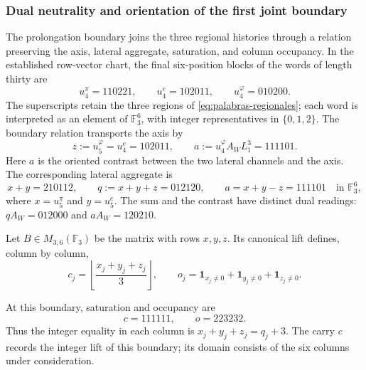 \subsubsection{Dual neutrality and orientation of the first joint boundary}
\label{mg01:frontera}

The prolongation boundary joins the three regional histories through
a relation preserving the axis, lateral aggregate, saturation, and
column occupancy. In the established row-vector chart, the final
six-position blocks of the words of length thirty are
\[
 u_4^\pi=110221,\qquad u_4^e=102011,\qquad
 u_4^\varphi=010200.
\]
The superscripts retain the three regions of
\eqref{eq:palabras-regionales}; each word is interpreted as an
element of \(\mathbb F_3^6\), with integer representatives in
\(\{0,1,2\}\). The boundary relation transports the axis by
\begin{equation}
 z:=u_5^\varphi=u_4^e=102011,
 \qquad a:=u_4^\varphi A_WL_1^3=111101.
 \label{mg01:eje-contraste}
\end{equation}
Here \(a\) is the oriented contrast between the two lateral channels
and the axis. The corresponding lateral aggregate is
\begin{equation}
 x+y=210112,\qquad
 q:=x+y+z=012120,\qquad a=x+y-z=111101
 \quad\text{in }\mathbb F_3^6,
 \label{mg01:agregados}
\end{equation}
where \(x=u_5^\pi\) and \(y=u_5^e\). The sum and the contrast have
distinct dual readings: \(qA_W=012000\) and \(aA_W=120210\).

Let \(B\in M_{3,6}(\mathbb F_3)\) be the matrix with rows \(x,y,z\).
Its canonical lift defines, column by column,
\[
 c_j=\left\lfloor\frac{x_j+y_j+z_j}{3}\right\rfloor,
 \qquad
 o_j=\mathbf1_{x_j\ne0}+\mathbf1_{y_j\ne0}+\mathbf1_{z_j\ne0}.
\]


At this boundary, saturation and occupancy are
\begin{equation}
 c=111111,\qquad o=223232.
 \label{mg01:saturacion}
\end{equation}
Thus the integer equality in each column is
\(x_j+y_j+z_j=q_j+3\). The carry \(c\) records the integer lift
of this boundary; its domain consists of the six columns under consideration.

